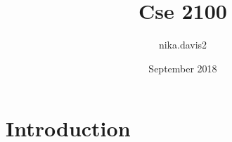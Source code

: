 \documentclass{article}
\title{Cse 2100}
\author{nika.davis2 }
\date{September 2018}
\begin{document}
\maketitle

\section{Introduction}
\end{document}
